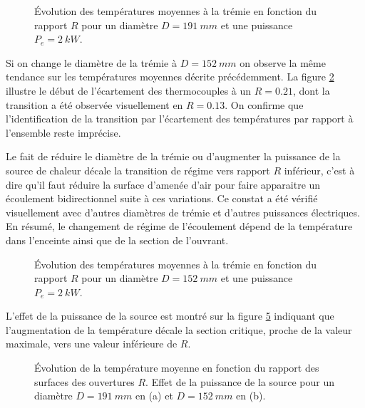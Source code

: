 \begin{figure}
\centering
\resizebox{0.67\textwidth}{!}{}
\caption{Évolution des températures moyennes à la trémie en fonction du rapport $R$ pour un diamètre $D=\SI{191}{mm}$ et une puissance $P_e=\SI{2}{kW}$.}
\label{fig:tc_moy_D191_1R}
\end{figure}

Si on change le diamètre de la trémie à $D=\SI{152}{mm}$ on observe la même tendance sur les températures moyennes décrite précédemment. La figure \ref{fig:tc_moy_D152_1R} illustre le début de l'écartement des thermocouples à un $R=0.21$, dont la transition a été observée visuellement en $R=0.13$. On confirme que l’identification de la transition par l'écartement des températures par rapport à l'ensemble reste imprécise.

Le fait de réduire le diamètre de la trémie ou d'augmenter la puissance de la source de chaleur décale la transition de régime vers rapport $R$ inférieur, c'est à dire qu'il faut réduire la surface d'amenée d'air pour faire apparaitre un écoulement bidirectionnel suite à ces variations. Ce constat a été vérifié visuellement avec d'autres diamètres de trémie et d'autres puissances électriques. En résumé, le changement de régime de l'écoulement dépend de la température dans l'enceinte ainsi que de la section de l'ouvrant. 

\begin{figure}
\centering
\resizebox{0.6\textwidth}{!}{}
\caption{Évolution des températures moyennes à la trémie en fonction du rapport $R$ pour un diamètre $D=\SI{152}{mm}$ et une puissance $P_e=\SI{2}{kW}$.}
\label{fig:tc_moy_D152_1R}
\end{figure}

L'effet de la puissance de la source est montré sur la figure \ref{fig:T_moy_effet_R} indiquant que l'augmentation de la température décale la section critique, proche de la valeur maximale, vers une valeur inférieure de $R$.

\begin{figure}
\centering
\begin{subfigure}[t]{0.485\textwidth}
  \centering
  \resizebox{\textwidth}{!}{}
  \caption{}
  \label{fig:T_moy_effet_R_D191}
\end{subfigure}
\begin{subfigure}[t]{0.485\textwidth}
  \centering
  \resizebox{\textwidth}{!}{}
  \caption{}
  \label{fig:T_moy_effet_R_D152}
\end{subfigure}
\caption{Évolution de la température moyenne en fonction du rapport des surfaces des ouvertures $R$. Effet de la puissance de la source pour un diamètre ${D=\SI{191}{mm}}$ en (a) et ${D=\SI{152}{mm}}$ en (b).}
\label{fig:T_moy_effet_R}
\end{figure}

